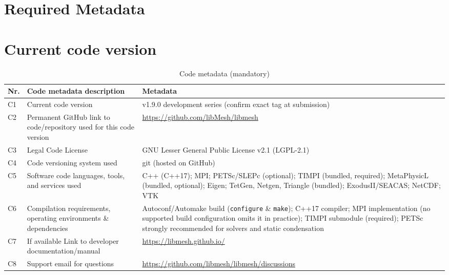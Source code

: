 \documentclass[preprint,12pt, a4paper]{elsarticle}
\begin{document}
\section*{Required Metadata}

\section*{Current code version}

\begin{table}[!h]
\begin{tabular}{|l|p{6.5cm}|p{6.5cm}|}
\hline
\textbf{Nr.} & \textbf{Code metadata description} & \textbf{Metadata} \\
\hline
C1 & Current code version & v1.9.0 development series (confirm exact tag at submission) \\
\hline
C2 & Permanent GitHub link to code/repository used for this code version & \url{https://github.com/libMesh/libmesh} \\
\hline
C3 & Legal Code License & GNU Lesser General Public License v2.1 (LGPL-2.1) \\
\hline
C4 & Code versioning system used & git (hosted on GitHub) \\
\hline
C5 & Software code languages, tools, and services used & C++ (C++17); MPI; PETSc/SLEPc (optional); TIMPI (bundled, required); MetaPhysicL (bundled, optional); Eigen; TetGen, Netgen, Triangle (bundled); ExodusII/SEACAS; NetCDF; VTK \\
\hline
C6 & Compilation requirements, operating environments \& dependencies & Autoconf/Automake build (\texttt{configure} \& \texttt{make}); C++17 compiler; MPI implementation (no supported build configuration omits it in practice); TIMPI submodule (required); PETSc strongly recommended for solvers and static condensation \\
\hline
C7 & If available Link to developer documentation/manual & \url{https://libmesh.github.io/} \\
\hline
C8 & Support email for questions & \url{https://github.com/libmesh/libmesh/discussions} \\
\hline
\end{tabular}
\caption{Code metadata (mandatory)}
\label{tab:metadata}
\end{table}
\end{document}
